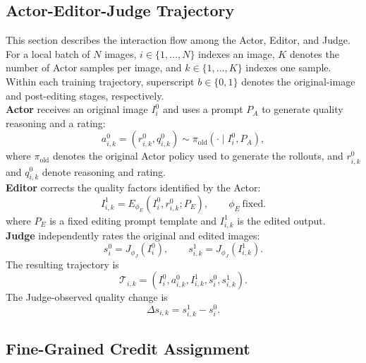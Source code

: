 \documentclass[letterpaper]{article} %
\begin{document}
\subsection{Actor-Editor-Judge Trajectory}
\label{sec:actor-editor-judge-trajectory}
This section describes the interaction flow among the Actor, Editor, and Judge.
For a local batch of $N$ images, $i\in\{1,\ldots,N\}$ indexes an image, $K$
denotes the number of Actor samples per image, and $k\in\{1,\ldots,K\}$ indexes
one sample.
Within each training trajectory, superscript $b\in\{0,1\}$ denotes the
original-image and post-editing stages, respectively. \\
\textbf{Actor} receives an original image $I_i^0$ and uses a prompt $P_A$ to
generate quality reasoning and a rating:
\begin{equation}
    a_{i,k}^0
    =
    \left(r_{i,k}^0,q_{i,k}^0\right)
    \sim
    \pi_{\mathrm{old}}\!\left(\cdot\mid I_i^0,P_A\right),
    \label{eq:actor-initial-rollout}
\end{equation}
where $\pi_{\mathrm{old}}$ denotes the original Actor policy used to generate
the rollouts, and $r_{i,k}^0$ and $q_{i,k}^0$ denote reasoning and rating. \\
\textbf{Editor} corrects the quality factors identified by the Actor:
\begin{equation}
    I_{i,k}^1
    =
    E_{\phi_E}\!\left(I_i^0,r_{i,k}^0;P_E\right),
    \qquad \phi_E\ \text{fixed}.
    \label{eq:editor-intervention}
\end{equation}
where $P_E$ is a fixed editing prompt template and $I_{i,k}^1$ is the edited
output.\\
\textbf{Judge} independently rates the original and edited images:
\begin{equation}
    s_i^0
        =J_{\phi_J}\!\left(I_i^0\right),
    \qquad
    s_{i,k}^1
        =J_{\phi_J}\!\left(I_{i,k}^1\right).
    \label{eq:judge-evaluation}
\end{equation}
The resulting trajectory is
\begin{equation}
    \mathcal{T}_{i,k}
    =
    \left(
    I_i^0,a_{i,k}^0,I_{i,k}^1,s_i^0,s_{i,k}^1
    \right).
    \label{eq:actor-editor-judge-trajectory}
\end{equation}
The Judge-observed quality change is
\begin{equation}
    \Delta s_{i,k}=s_{i,k}^1-s_i^0.
    \label{eq:judge-quality-change}
\end{equation}

\subsection{Fine-Grained Credit Assignment}
\end{document}
